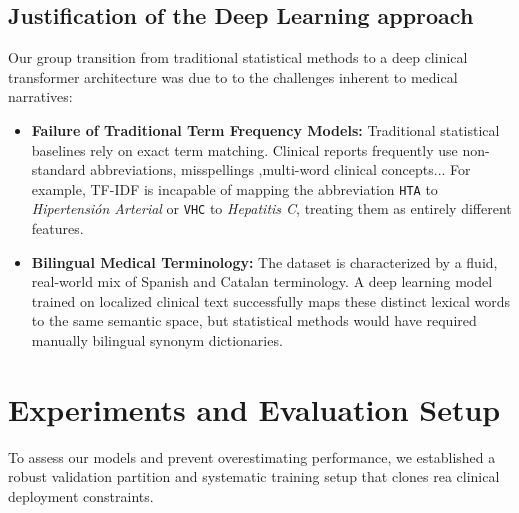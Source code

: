 \documentclass{article}
\begin{document}
\subsection{Justification of the Deep Learning approach}
Our group transition from traditional statistical methods to a deep clinical transformer architecture was due to to the challenges inherent to medical narratives:
\begin{itemize}
    \item \textbf{Failure of Traditional Term Frequency Models:} Traditional statistical baselines rely on exact term matching. Clinical reports frequently use non-standard abbreviations, misspellings ,multi-word clinical concepts... For example, TF-IDF is incapable of mapping the abbreviation \texttt{HTA} to \textit{Hipertensión Arterial} or \texttt{VHC} to \textit{Hepatitis C}, treating them as entirely different features.
    
    \item \textbf{Bilingual Medical Terminology:} The dataset is characterized by a fluid, real-world mix of Spanish and Catalan terminology. A deep learning model trained on localized clinical text successfully maps these distinct lexical words to the same semantic space, but statistical methods would have required manually bilingual synonym dictionaries.
    
\vspace{\baselineskip}
\vspace{\baselineskip}
\vspace{\baselineskip}
\vspace{\baselineskip}





\end{itemize}

\section{Experiments and Evaluation Setup}
To assess our models and prevent overestimating performance, we established a robust validation partition and systematic training setup that clones rea clinical deployment constraints.
\vspace{\baselineskip}
\end{document}
